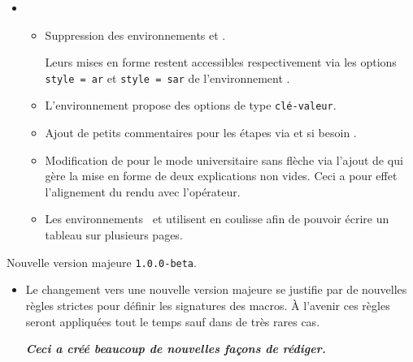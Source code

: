 \documentclass[12pt,a4paper]{book}
\begin{document}
\begin{description}
\begin{itemize}[itemsep=.5em]
    \item {}
    \begin{itemize}[itemsep=.5em]
        \item Suppression des environnements  et .

              \smallskip

              Leurs mises en forme restent accessibles respectivement via les options \verb+style = ar+ et \verb+style = sar+ de l'environnement .


        \item L'environnement  propose des options de type \texttt{clé-valeur}.


        \item Ajout de petits commentaires pour les étapes via  et si besoin .


        \item Modification de  pour le mode universitaire sans flèche via l'ajout de  qui gère la mise en forme de deux explications non vides.
              Ceci a pour effet l'alignement du rendu avec l'opérateur.


        \item Les environnements  et  utilisent  en coulisse afin de pouvoir écrire un tableau sur plusieurs pages.
    \end{itemize}
\end{itemize}

\end{description}\begin{description}
\medskip
\item[2020-06-21] Nouvelle version majeure \verb+1.0.0-beta+.

\begin{itemize}[itemsep=.5em]
    \item Le changement vers une nouvelle version majeure se justifie par de nouvelles règles strictes pour définir les signatures des macros. À l'avenir ces règles seront appliquées tout le temps sauf dans de très rares cas.
    \begin{center}
		\bfseries\itshape
		Ceci a créé beaucoup de nouvelles façons de rédiger.
    \end{center}






\end{itemize}
\end{description}
\end{document}
